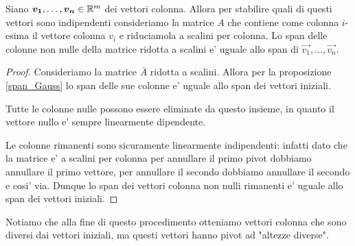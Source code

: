 \begin{proposition} \label{span_colonne_indipendenti}
    Siano $\bm{v_1}, \dots, \bm{v_n} \in \mathbb{R}^m$ dei vettori colonna. Allora per stabilire quali di questi vettori sono indipendenti consideriamo la matrice $A$ che contiene come colonna $i$-esima il vettore colonna $v_i$ e riduciamola a scalini per colonna. Lo span delle colonne non nulle della matrice ridotta a scalini e' uguale allo span di $\vec{v_1}, \dots, \vec{v_n}$.
\end{proposition}
\begin{proof} 
    Consideriamo la matrice $\bar{A}$ ridotta a scalini. Allora per la proposizione \ref{span_Gauss} lo span delle sue colonne e' uguale allo span dei vettori iniziali. 

    Tutte le colonne nulle possono essere eliminate da questo insieme, in quanto il vettore nullo e' sempre linearmente dipendente.

    Le colonne rimanenti sono sicuramente linearmente indipendenti: infatti dato che la matrice e' a scalini per colonna per annullare il primo pivot dobbiamo annullare il primo vettore, per annullare il secondo dobbiamo annullare il secondo e cosi' via. Dunque lo span dei vettori colonna non nulli rimanenti e' uguale allo span dei vettori iniziali.
\end{proof}

Notiamo che alla fine di questo procedimento otteniamo vettori colonna che sono diversi dai vettori iniziali, ma questi vettori hanno pivot ad "altezze diverse".

